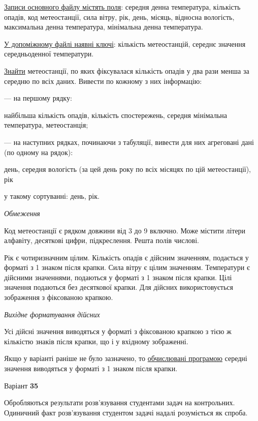 \documentclass[11pt, ukrainian]{article}
\begin{document}
\underline{Записи основного файлу містять поля}: середня денна температура, кількість опадів, код метеостанції, сила вітру, рік, день, місяць, відносна вологість, максимальна денна температура, мінімальна денна температура.

\underline{У допоміжному файлі наявні ключі}: кількість метеостанцій, середнє значення середньоденної температури.

\underline{Знайти} метеостанції, по яких фіксувалася кількість опадів у два рази менша за середню по всіх даних. Вивести по кожному з них інформацію:\par
{\noindent}--- на першому рядку:\par
найбільша кількість опадів, кількість спостережень, середня мінімальна температура, метеостанція;

{\noindent}--- на наступних рядках, починаючи з табуляції, вивести для них агреговані дані (по одному на рядок):\par
день, середня вологість (за цей день року по всіх місяцях по цій метеостанції), рік

{\noindent}у такому сортуванні: день, рік.


\bigskip\textit{Обмеження}

Код метеостанції є рядком довжини від 3 до 9 включно.
Може містити літери алфавіту, десяткові цифри, підкреслення. Решта полів числові.

Рік є чотиризначним цілим.
Кількість опадів є дійсним значенням, подається у форматі з 1 знаком після крапки.
Сила вітру є цілим значенням.
Температури є дійсними значеннями, подаються у форматі з 1 знаком після крапки.
Цілі значення подаються без десяткової крапки.
Для дійсних використовується зображення з фіксованою крапкою.

\textit{Вихідне форматування дійсних}

Усі дійсні значення виводяться у форматі з фіксованою крапкою з тією ж кількістю знаків після крапки, що і у вхідному зображенні.

Якщо у варіанті раніше не було зазначено, то \underline{обчислювані програмою} середні значення виводяться у форматі з 1 знаком після крапки.




\par
\newpage
{\center Варіант  \No \textbf { 35 }\par}
\bigskip
Обробляються результати розв’язування студентами задач на контрольних.
Одиничний факт роз\-в’я\-зу\-вання студентом задачі надалі розуміється як спроба.
\end{document}
